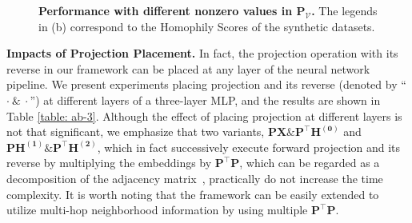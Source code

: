 \documentclass[review]{elsarticle}
\begin{document}
\begin{figure}[htbp]
  \centering
{}\hspace{8mm}
\caption{\textbf{Performance with different nonzero values in $\mathbf{P}_\mathcal{V}$.} The legends in (b) correspond to the Homophily Scores of the synthetic datasets.}
  \label{fig:q1}
\end{figure}

\textbf{Impacts of Projection Placement.} In fact, the projection operation with its reverse in our framework can be placed at any layer of the neural network pipeline. We present experiments placing projection and its reverse (denoted by ``$\cdot~\&~\cdot$'') at different layers of a three-layer MLP, and the results are shown in Table \ref{table: ab-3}. Although the effect of placing projection at different layers is not that significant, we emphasize that two variants, $\mathbf{PX}\&\mathbf{P^{\top}H^{(0)}}$ and $\mathbf{PH^{(1)}}\&\mathbf{P^{\top}H^{(2)}}$, which in fact successively execute forward projection and its reverse by multiplying the embeddings by $\mathbf{P}^\top\mathbf{P}$, which can be regarded as a decomposition of the adjacency matrix~\cite{yang2015network,huang2017accelerated}, practically do not increase the time complexity. It is worth noting that the framework can be easily extended to utilize multi-hop neighborhood information by using multiple $\mathbf{P}^\top\mathbf{P}$.
\end{document}
